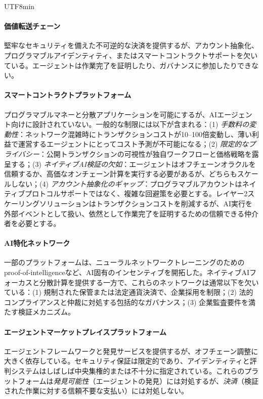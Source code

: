 \documentclass[11pt]{article}
\begin{document}
\begin{CJK}{UTF8}{min}
\paragraph{価値転送チェーン} 堅牢なセキュリティを備えた不可逆的な決済を提供するが、アカウント抽象化、プログラマブルアイデンティティ、またはスマートコントラクトサポートを欠いている。エージェントは作業完了を証明したり、ガバナンスに参加したりできない。

\paragraph{スマートコントラクトプラットフォーム} プログラマブルマネーと分散アプリケーションを可能にするが、AIエージェント向けに設計されていない。一般的な制限には以下が含まれる：(1) \emph{手数料の変動性}：ネットワーク混雑時にトランザクションコストが10--100倍変動し、薄い利益で運営するエージェントにとってコスト予測が不可能になる；(2) \emph{限定的なプライバシー}：公開トランザクションの可視性が独自ワークフローと価格戦略を露呈する；(3) \emph{ネイティブAI検証の欠如}：エージェントはオフチェーンオラクルを信頼するか、高価なオンチェーン計算を実行する必要があるが、どちらもスケールしない；(4) \emph{アカウント抽象化のギャップ}：プログラマブルアカウントはネイティブプロトコルサポートではなく、複雑な回避策を必要とする。レイヤー2スケーリングソリューションはトランザクションコストを削減するが、AI実行を外部イベントとして扱い、依然として作業完了を証明するための信頼できる仲介者を必要とする。

\paragraph{AI特化ネットワーク} 一部のプラットフォームは、ニューラルネットワークトレーニングのためのproof-of-intelligenceなど、AI固有のインセンティブを開拓した。ネイティブAIフォーカスと分散計算を提供する一方で、これらのネットワークは通常以下を欠いている：(1) 規制された保管または法定通貨決済で、企業採用を制限；(2) 法的コンプライアンスと仲裁に対処する包括的なガバナンス；(3) 企業監査要件を満たす検証メカニズム。

\paragraph{エージェントマーケットプレイスプラットフォーム} エージェントフレームワークと発見サービスを提供するが、オフチェーン調整に大きく依存している。セキュリティ保証は限定的であり、アイデンティティと評判システムはしばしば中央集権的または不十分に指定されている。これらのプラットフォームは\emph{発見可能性}（エージェントの発見）には対処するが、\emph{決済}（検証された作業に対する信頼不要な支払い）には対処しない。


\end{CJK}
\end{document}
